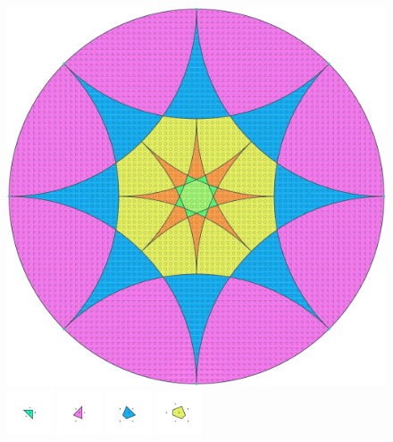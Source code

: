 \documentclass[text.tex]{subfiles}
\begin{document}
\clearpage
\pagestyle{fancy}
\fancyhf{}
\begin{figure}[h!]
\centering
\includegraphics[width=1\textwidth]{img/results/circle8/circle8_170710_(1_1alpha_2).pdf}
\includegraphics[width=0.12\textwidth]{img/results/circle8/circle8_170710_(1_1alpha_2)_001.pdf}
\includegraphics[width=0.12\textwidth]{img/results/circle8/circle8_170710_(1_1alpha_2)_002.pdf}
\includegraphics[width=0.12\textwidth]{img/results/circle8/circle8_170710_(1_1alpha_2)_003.pdf}
\includegraphics[width=0.12\textwidth]{img/results/circle8/circle8_170710_(1_1alpha_2)_004.pdf}

\end{figure}
\end{document}
